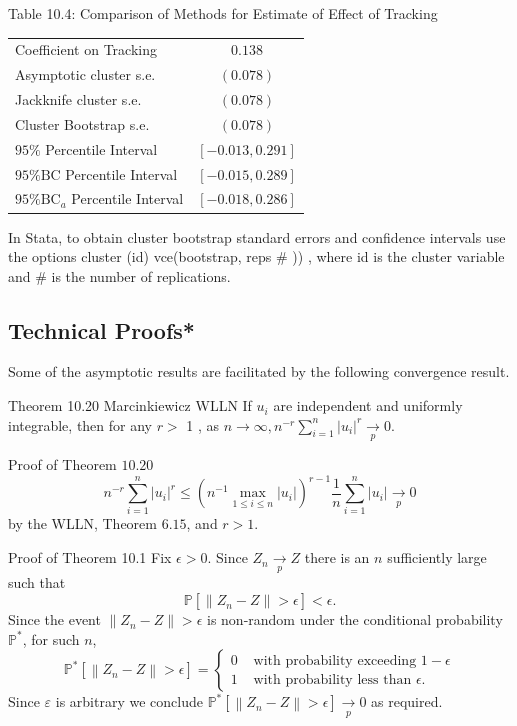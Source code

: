 \documentclass[10pt]{article}
\begin{document}
Table 10.4: Comparison of Methods for Estimate of Effect of Tracking

\begin{tabular}{lc}
\hline\hline
Coefficient on Tracking & $0.138$ \\
Asymptotic cluster s.e. & $(0.078)$ \\
Jackknife cluster s.e. & $(0.078)$ \\
Cluster Bootstrap s.e. & $(0.078)$ \\
$95 \%$ Percentile Interval & $[-0.013,0.291]$ \\
$95 \% \mathrm{BC}$ Percentile Interval & $[-0.015,0.289]$ \\
$95 \% \mathrm{BC}_{a}$ Percentile Interval & $[-0.018,0.286]$ \\
\hline
\end{tabular}

In Stata, to obtain cluster bootstrap standard errors and confidence intervals use the options cluster (id) vce(bootstrap, reps $\#$ )) , where id is the cluster variable and \# is the number of replications.

\subsection{Technical Proofs*}
Some of the asymptotic results are facilitated by the following convergence result.

Theorem 10.20 Marcinkiewicz WLLN If $u_{i}$ are independent and uniformly integrable, then for any $r>$ 1 , as $n \rightarrow \infty, n^{-r} \sum_{i=1}^{n}\left|u_{i}\right|^{r} \underset{p}{\longrightarrow} 0$.

Proof of Theorem $10.20$
$$
n^{-r} \sum_{i=1}^{n}\left|u_{i}\right|^{r} \leq\left(n^{-1} \max _{1 \leq i \leq n}\left|u_{i}\right|\right)^{r-1} \frac{1}{n} \sum_{i=1}^{n}\left|u_{i}\right| \underset{p}{\longrightarrow} 0
$$
by the WLLN, Theorem $6.15$, and $r>1$.

Proof of Theorem 10.1 Fix $\epsilon>0$. Since $Z_{n} \underset{p}{\longrightarrow} Z$ there is an $n$ sufficiently large such that
$$
\mathbb{P}\left[\left\|Z_{n}-Z\right\|>\epsilon\right]<\epsilon .
$$
Since the event $\left\|Z_{n}-Z\right\|>\epsilon$ is non-random under the conditional probability $\mathbb{P}^{*}$, for such $n$,
$$
\mathbb{P}^{*}\left[\left\|Z_{n}-Z\right\|>\epsilon\right]=\left\{\begin{array}{cc}
0 & \text { with probability exceeding } 1-\epsilon \\
1 & \text { with probability less than } \epsilon .
\end{array}\right.
$$
Since $\varepsilon$ is arbitrary we conclude $\mathbb{P}^{*}\left[\left\|Z_{n}-Z\right\|>\epsilon\right] \underset{p}{\longrightarrow} 0$ as required.
\end{document}
